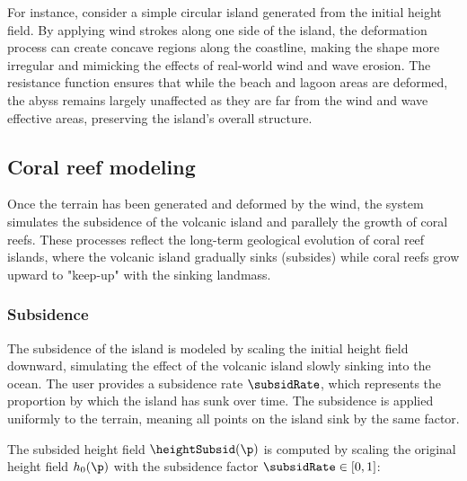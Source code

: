 For instance, consider a simple circular island generated from the initial height field. By applying wind strokes along one side of the island, the deformation process can create concave regions along the coastline, making the shape more irregular and mimicking the effects of real-world wind and wave erosion. The resistance function ensures that while the beach and lagoon areas are deformed, the abyss remains largely unaffected as they are far from the wind and wave effective areas, preserving the island's overall structure.




\subsection{Coral reef modeling}
\label{sec:coral-island_coral-reef}


Once the terrain has been generated and deformed by the wind, the system simulates the subsidence of the volcanic island and parallely the growth of coral reefs. These processes reflect the long-term geological evolution of coral reef islands, where the volcanic island gradually sinks (subsides) while coral reefs grow upward to "keep-up" with the sinking landmass.

\subsubsection{Subsidence}
\label{sec:coral-island_subsidence}

The subsidence of the island is modeled by scaling the initial height field downward, simulating the effect of the volcanic island slowly sinking into the ocean. The user provides a subsidence rate $\subsidRate$, which represents the proportion by which the island has sunk over time. The subsidence is applied uniformly to the terrain, meaning all points on the island sink by the same factor.

The subsided height field $\heightSubsid(\p)$ is computed by scaling the original height field $h_0(\p)$ with the subsidence factor $\subsidRate \in [0, 1]$:

